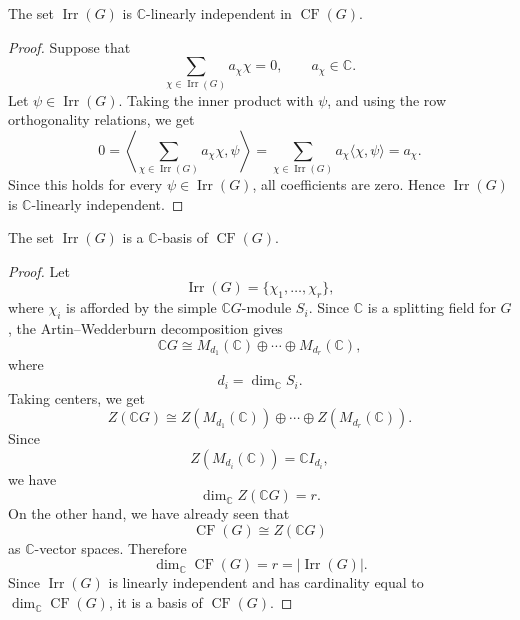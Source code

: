 \begin{corollary}
    The set \(\operatorname{Irr}(G)\) is \(\mathbb{C}\)-linearly independent in
    \(\operatorname{CF}(G)\).
\end{corollary}

\begin{proof}
    Suppose that
    \[
        \sum_{\chi\in \operatorname{Irr}(G)} a_\chi \chi=0,
        \qquad a_\chi\in \mathbb{C}.
    \]
    Let \(\psi\in \operatorname{Irr}(G)\). Taking the inner product with \(\psi\),
    and using the row orthogonality relations, we get
    \[
        0
        =
        \left\langle
        \sum_{\chi\in \operatorname{Irr}(G)} a_\chi \chi,\psi
        \right\rangle
        =
        \sum_{\chi\in \operatorname{Irr}(G)} a_\chi
        \langle \chi,\psi\rangle
        =
        a_\chi.
    \]
    Since this holds for every \(\psi\in \operatorname{Irr}(G)\), all coefficients
    are zero. Hence \(\operatorname{Irr}(G)\) is \(\mathbb{C}\)-linearly
    independent.
\end{proof}

\begin{corollary}
    The set \(\operatorname{Irr}(G)\) is a \(\mathbb{C}\)-basis of
    \(\operatorname{CF}(G)\).
\end{corollary}

\begin{proof}
    Let
    \[
        \operatorname{Irr}(G)=\{\chi_1,\dots,\chi_r\},
    \]
    where \(\chi_i\) is afforded by the simple \(\mathbb{C}G\)-module \(S_i\).
    Since \(\mathbb{C}\) is a splitting field for \(G\), the Artin--Wedderburn
    decomposition gives
    \[
        \mathbb{C}G
        \cong
        M_{d_1}(\mathbb{C})
        \oplus
        \cdots
        \oplus
        M_{d_r}(\mathbb{C}),
    \]
    where
    \[
        d_i=\dim_{\mathbb{C}}S_i.
    \]
    Taking centers, we get
    \[
        Z(\mathbb{C}G)
        \cong
        Z(M_{d_1}(\mathbb{C}))
        \oplus
        \cdots
        \oplus
        Z(M_{d_r}(\mathbb{C})).
    \]
    Since
    \[
        Z(M_{d_i}(\mathbb{C}))=\mathbb{C}I_{d_i},
    \]
    we have
    \[
        \dim_{\mathbb{C}}Z(\mathbb{C}G)=r.
    \]
    On the other hand, we have already seen that
    \[
        \operatorname{CF}(G)\cong Z(\mathbb{C}G)
    \]
    as \(\mathbb{C}\)-vector spaces. Therefore
    \[
        \dim_{\mathbb{C}}\operatorname{CF}(G)
        =
        r
        =
        |\operatorname{Irr}(G)|.
    \]
    Since \(\operatorname{Irr}(G)\) is linearly independent and has cardinality
    equal to \(\dim_{\mathbb{C}}\operatorname{CF}(G)\), it is a basis of
    \(\operatorname{CF}(G)\).
\end{proof}

